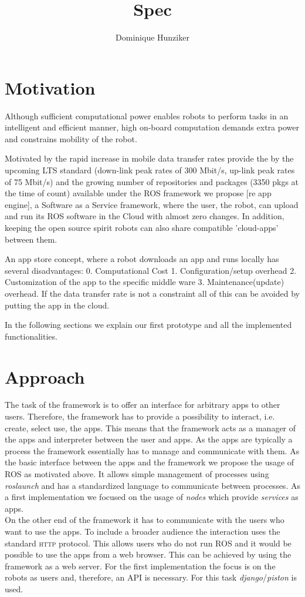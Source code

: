 \documentclass[10pt,a4paper]{article}
\title {Spec}
\author {Dominique Hunziker}
\begin{document}
	\section*{Motivation}
		Although sufficient computational power enables robots to perform
		tasks in an intelligent and efficient manner, high on-board
		computation demands extra power and constrains mobility of the robot.
		
		Motivated by the rapid increase in mobile data transfer rates provide
		the by the upcoming LTS standard (down-link peak rates of 300 Mbit/s,
		up-link peak rates of 75 Mbit/s) and the growing number of
		repositories and packages (3350 pkgs at the time of count) available
		under the ROS framework we propose [re app engine], a Software as a
		Service framework, where the user, the robot, can upload and run its
		ROS software in the Cloud with almost zero changes. In addition,
		keeping the open source spirit robots can also share compatible
		'cloud-apps' between them.
		
		An app store concept, where a robot downloads an app and runs locally
		has several disadvantages: 0. Computational Cost 1.
		Configuration/setup overhead 2. Customization of the app to the
		specific middle ware 3. Maintenance(update) overhead. If the data
		transfer rate is not a constraint all of this can be avoided by
		putting the app in the cloud.
		
		In the following sections we explain our first prototype and all the
		implemented functionalities.
	
	\section*{Approach}
		The task of the framework is to offer an interface for arbitrary apps to other users.
		Therefore, the framework has to provide a possibility to interact, i.e. create, select
		use, the apps. This means that the framework acts as a manager of the apps and interpreter
		between the user and apps. As the apps are typically a process the framework essentially
		has to manage and communicate with them. As the basic interface between the apps and the
		framework we propose the usage of \textsc{ROS} as motivated above. It allows simple management
		of processes using \emph{roslaunch} and has a standardized language to communicate between
		processes. As a first implementation we focused on the usage of \emph{nodes} which provide
		\emph{services} as apps. \\
		On the other end of the framework it has to communicate with the users who want to use the
		apps. To include a broader audience the interaction uses the standard \textsc{http} protocol.
		This allows users who do not run \textsc{ROS} and it would be possible to use the apps from
		a web browser. This can be achieved by using the framework as a web server. For the first
		implementation the focus is on the robots as users and, therefore, an API is necessary. For
		this task \emph{django}/\emph{piston} is used.
	
\end{document}
